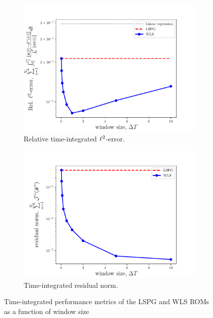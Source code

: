 \begin{figure}
\begin{center}
\begin{subfigure}[t]{0.49\textwidth}
\includegraphics[trim={0cm 0cm 0cm 0cm},clip,width=1.0\linewidth]{figs/swe/swe_windowSize_vs_error_K83.pdf}
\caption{Relative time-integrated $\ell^2$-error.}
\end{subfigure}
\begin{subfigure}[t]{0.49\textwidth}
\includegraphics[trim={0cm 0cm 0cm 0cm},clip,width=1.0\linewidth]{figs/swe/swe_windowSize_vs_residual_K83.pdf}
\caption{Time-integrated residual norm.}
\end{subfigure}
\caption{Time-integrated performance metrics of the LSPG and WLS ROMs as a function of window size} 
\label{fig:rom_swe_metrics}
\end{center}
\end{figure}

